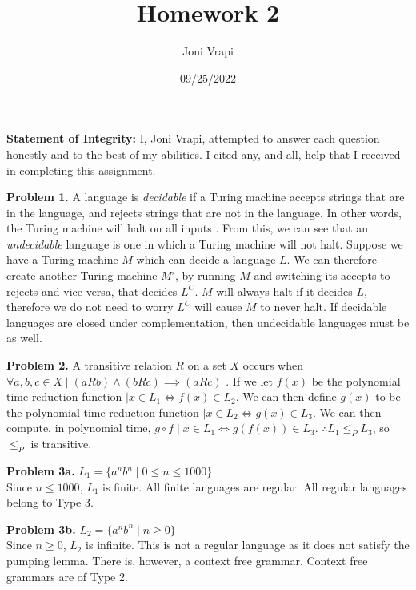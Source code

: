 \documentclass{article}
\title{Homework 2}
\author{Joni Vrapi}
\date{09/25/2022}
\begin{document}
\maketitle

\textbf{Statement of Integrity:} I, Joni Vrapi, attempted to answer each question honestly and to the best of my abilities. I cited any, and all, help that I received in completing this assignment.

\hfill

\textbf{Problem 1.} A language is \emph{decidable} if a Turing machine accepts strings that are in the language, and rejects strings that are not in the language. In other words, the Turing machine will halt on all inputs \cite{website:1}. From this, we can see that an \emph{undecidable} language is one in which a Turing machine will not halt. Suppose we have a Turing machine $M$ which can decide a language $L$. We can therefore create another Turing machine $M'$, by running $M$ and switching its accepts to rejects and vice versa, that decides $L^C$. $M$ will always halt if it decides $L$, therefore we do not need to worry $L^C$ will cause $M$ to never halt. If decidable languages are closed under complementation, then undecidable languages must be as well.

\hfill

\textbf{Problem 2.} A transitive relation $R$ on a set $X$ occurs when $\forall a, b, c \in X \mid (aRb) \land (bRc) \implies (aRc)$ \cite{website:2}. If we let $f(x)$ be the polynomial time reduction function $\mid x \in L_1 \iff f(x) \in L_2$. We can then define $g(x)$ to be the polynomial time reduction function $\mid x \in L_2 \iff g(x) \in L_3$. We can then compute, in polynomial time, $g \circ f \mid x \in L_1 \iff g(f(x)) \in L_3$. $\therefore L_1 \leq_P L_3$, so $\leq_P$ is transitive.

\hfill

\textbf{Problem 3a.} $L_1 = \{ a^nb^n \mid 0 \leq n \leq 1000 \}$ \\
Since $n \leq 1000$,  $L_1$ is finite. All finite languages are regular. All regular languages belong to Type 3.

\hfill

\textbf{Problem 3b.} $L_2 = \{ a^nb^n \mid n \geq 0 \}$ \\
Since $n \geq 0$,  $L_2$ is infinite. This is not a regular language as it does not satisfy the pumping lemma. There is, however, a context free grammar. Context free grammars are of Type 2.

\hfill
\end{document}

